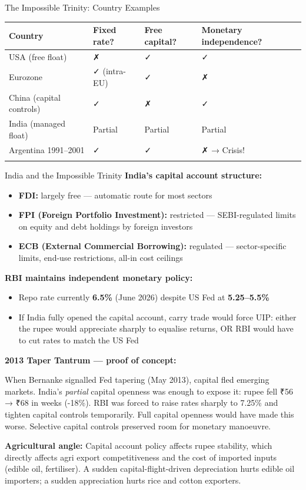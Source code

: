 \documentclass[
  ignorenonframetext,
  aspectratio=169,
]{beamer}
\makeatletter
\providecommand{\tightlist}{%
  \setlength{\itemsep}{0pt}\setlength{\parskip}{0pt}}
\let\quarto@originallabel\label
\DeclareRobustCommand*{\label}[1]{\quarto@originallabel{#1}}
\makeatother
\begin{document}
\begin{frame}{The Impossible Trinity: Country Examples}
\label{the-impossible-trinity-country-examples}
\begin{longtable}[]{@{}llll@{}}
\toprule\noalign{}
Country & Fixed rate? & Free capital? & Monetary independence? \\
\midrule\noalign{}
\endhead
USA (free float) & ✗ & ✓ & ✓ \\
Eurozone & ✓ (intra-EU) & ✓ & ✗ \\
China (capital controls) & ✓ & ✗ & ✓ \\
India (managed float) & Partial & Partial & Partial \\
Argentina 1991--2001 & ✓ & ✓ & ✗ → Crisis! \\
\bottomrule\noalign{}
\end{longtable}
\end{frame}

\begin{frame}{India and the Impossible Trinity}
\label{india-and-the-impossible-trinity}
\textbf{India's capital account structure:}

\begin{itemize}
\tightlist
\item
  \textbf{FDI:} largely free --- automatic route for most sectors
\item
  \textbf{FPI (Foreign Portfolio Investment):} restricted ---
  SEBI-regulated limits on equity and debt holdings by foreign investors
\item
  \textbf{ECB (External Commercial Borrowing):} regulated ---
  sector-specific limits, end-use restrictions, all-in cost ceilings
\end{itemize}

\textbf{RBI maintains independent monetary policy:}

\begin{itemize}
\tightlist
\item
  Repo rate currently \textbf{6.5\%} (June 2026) despite US Fed at
  \textbf{5.25--5.5\%}
\item
  If India fully opened the capital account, carry trade would force
  UIP: either the rupee would appreciate sharply to equalise returns, OR
  RBI would have to cut rates to match the US Fed
\end{itemize}

\textbf{2013 Taper Tantrum --- proof of concept:}

When Bernanke signalled Fed tapering (May 2013), capital fled emerging
markets. India's \emph{partial} capital openness was enough to expose
it: rupee fell ₹56 → ₹68 in weeks (-18\%). RBI was forced to raise rates
sharply to 7.25\% and tighten capital controls temporarily. Full capital
openness would have made this worse. Selective capital controls
preserved room for monetary manoeuvre.

\textbf{Agricultural angle:} Capital account policy affects rupee
stability, which directly affects agri export competitiveness and the
cost of imported inputs (edible oil, fertiliser). A sudden
capital-flight-driven depreciation hurts edible oil importers; a sudden
appreciation hurts rice and cotton exporters.
\end{frame}
\end{document}
